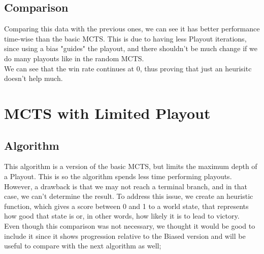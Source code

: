 \documentclass{article}
\begin{document}
  \subsection{Comparison}
  Comparing this data with the previous ones, we can see it has better performance time-wise than the basic MCTS. This is due to having less Playout iterations,
  since using a bias "guides" the playout, and there shouldn't be much change if we do many playouts like in the random MCTS.\\
  We can see that the win rate continues at 0, thus proving that just an heurisitc doesn't help much. 

  \section{MCTS with Limited Playout}

  \subsection{Algorithm}
  This algorithm is a version of the basic MCTS,  but limits the maximum depth of a Playout. This is so the algorithm spends less time performing playouts. However,
  a drawback is that we may not reach a terminal branch, and in that case, we can't determine the result. To address this issue, we create an heuristic function,
  which gives a score between 0 and 1 to a world state, that represents how good that state is or, in other words, how likely it is to lead to victory. \\
  Even though this comparison was not necessary, we thought it would be good to include it since it shows progression relative to the Biased version and will be useful
  to compare with the next algorithm as well;
  
\end{document}
